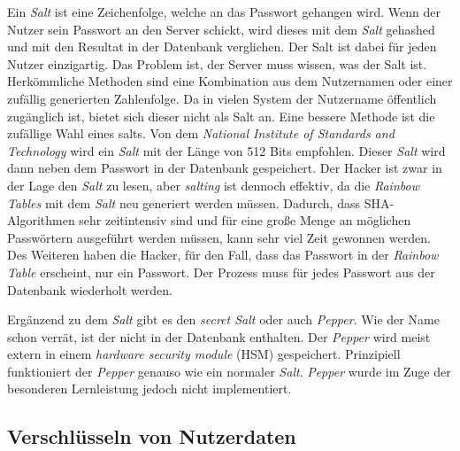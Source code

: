 Ein \textit{Salt} ist eine Zeichenfolge, welche an das Passwort gehangen wird. Wenn der Nutzer sein Passwort an den Server schickt, wird dieses mit dem \textit{Salt} gehashed und mit den Resultat in der Datenbank verglichen. Der Salt ist dabei für jeden Nutzer einzigartig. Das Problem ist, der Server muss wissen, was der Salt ist. Herkömmliche Methoden sind eine Kombination aus dem Nutzernamen oder einer zufällig generierten Zahlenfolge. Da in vielen System der Nutzername öffentlich zugänglich ist, bietet sich dieser nicht als Salt an. Eine bessere Methode ist die zufällige Wahl eines salts. Von dem \textit{National Institute of Standards and Technology}
wird ein \textit{Salt} mit der Länge von 512 Bits empfohlen. Dieser \textit{Salt} wird dann neben dem Passwort in der Datenbank gespeichert. Der Hacker ist zwar in der Lage den \textit{Salt} zu lesen, aber \textit{salting} ist dennoch effektiv, da die \textit{Rainbow Tables} mit dem \textit{Salt} neu generiert werden müssen. Dadurch, dass SHA-Algorithmen sehr zeitintensiv sind und für eine große Menge an möglichen Passwörtern ausgeführt werden müssen, kann sehr viel Zeit gewonnen werden. Des Weiteren haben die Hacker, für den Fall, dass das Passwort in der \textit{Rainbow Table} erscheint, nur ein Passwort. Der Prozess muss für jedes Passwort aus der Datenbank wiederholt werden.

Ergänzend zu dem \textit{Salt} gibt es den \textit{secret Salt} oder auch \textit{Pepper}. Wie der Name schon verrät, ist der nicht in der Datenbank enthalten. Der \textit{Pepper} wird meist extern in einem \textit{hardware security module} (HSM) gespeichert. Prinzipiell funktioniert der \textit{Pepper} genauso wie ein normaler \textit{Salt}. \textit{Pepper} wurde im Zuge der besonderen Lernleistung jedoch nicht implementiert.

\subsection{Verschlüsseln von Nutzerdaten}


